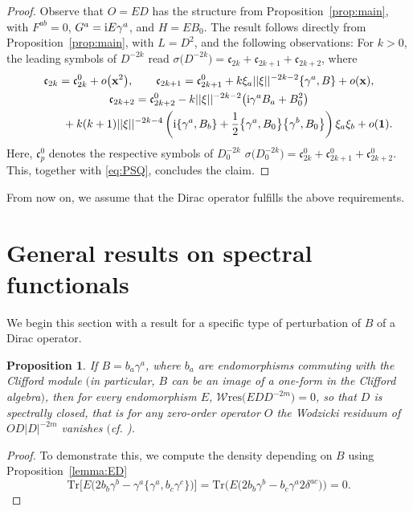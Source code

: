 \documentclass[10pt,a4paper]{amsart}
\numberwithin{equation}{section}
\newtheorem{Proposition}[Theorem]{Proposition}
\theoremstyle{definition}
\def\W{\mathscr{W} \mathrm{res}}
\def\Tr{\mathrm{Tr}}
\begin{document}
\begin{proof}
	Observe that $O = ED$ has the structure from Proposition~\ref{prop:main}, with $F^{ab} = 0$, $G^a = {\rm i}E\gamma^a$, and $H = EB_0$. The result follows directly from Proposition~\ref{prop:main}, with $L = D^2$, and the following observations: For $k > 0$, the leading symbols of $D^{-2k}$ read
$\sigma\bigl(D^{-2k}\bigr)=\mathfrak{c}_{2k}+\mathfrak{c}_{2k+1}+\mathfrak{c}_{2k+2}$,
where%
\begin{gather*}%
		\mathfrak c_{2k} = \mathfrak c^0_{2k} + o\bigl({\bf x}^2\bigr),\qquad
		\mathfrak c_{2k+1}= \mathfrak c^0_{2k+1}+k \xi_a||\xi||^{-2k-2} \{\gamma^a,B\} + o({\bf x}),\\
		\mathfrak c_{2k+2}= \mathfrak c^0_{2k+2}-k||\xi||^{-2k-2} \bigl({\rm i}\gamma^aB_a+B^2_0\bigr) \\
		 \phantom{\mathfrak c_{2k+2}=}{} +k(k+1) ||\xi||^{-2k-4}\left({\rm i}\{\gamma^a,B_b\}+\frac12\bigl\{\gamma^a,B_0\bigr\}\bigl\{\gamma^b,B_0\bigr\}\right) \xi_a \xi_b + o({\bf 1}).
\end{gather*}
Here, $\mathfrak{c}_p^0$ denotes the respective symbols of $D_0^{-2k}$
$\sigma\bigl(D_0^{-2k}\bigr) = \mathfrak{c}_{2k}^0 + \mathfrak{c}_{2k+1}^0 + \mathfrak{c}_{2k+2}^0$. This, together with \eqref{eq:PSQ}, concludes the claim.
\end{proof}

From now on, we assume that the Dirac operator fulfills the above requirements.

\section{General results on spectral functionals}

We begin this section with a result for a specific type of perturbation of $B$ of a Dirac operator.
\begin{Proposition}
	\label{rem:0}
	If $B= b_a\gamma^a$, where $b_a$ are endomorphisms commuting with the Clifford module $($in particular, $B$ can be an image of a one-form in the Clifford algebra$)$, then for every endomorphism $E$, $\W\bigl(EDD^{-2m}\bigr) = 0$, so that $D$ is spectrally closed, that is for any zero-order operator $O$ the Wodzicki residuum of $OD|D|^{-2m}$ vanishes $($cf. {\rm\cite[\emph{Definition}~5.5]{dabrowski2023})}.
\end{Proposition}
\begin{proof}
	To demonstrate this, we compute the density depending on $B$ using Proposition~\ref{lemma:ED}
	\[
		\Tr\bigl[E \bigl(2 b_b\gamma^b - \gamma^a
		\{\gamma^a,b_c\gamma^c\}\bigr)\bigr]
		=\Tr\bigl( E \bigl( 2 b_b \gamma^b -
		b_c \gamma^a 2 \delta^{ac} \bigr) \bigr) =0.\tag*{\qed}
	\]\renewcommand{\qed}{}
\end{proof}
\end{document}
